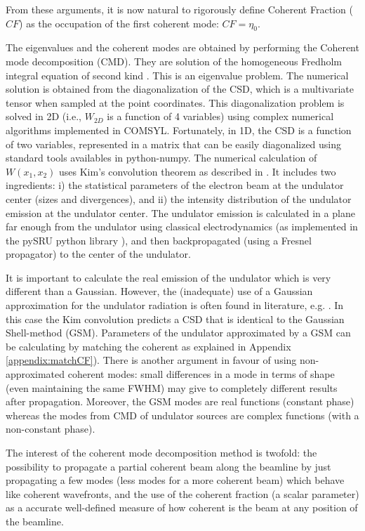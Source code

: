 \documentclass{iucr}              %
\begin{document}
From these arguments, it is now natural to rigorously define Coherent Fraction ($CF$) as the occupation of the first coherent mode: $CF=\eta_0$.

The eigenvalues and the coherent modes are obtained by performing the Coherent mode decomposition (CMD). They are solution of the homogeneous Fredholm integral equation of second kind \cite{glass2017}. This is an eigenvalue problem. The numerical solution is obtained from the diagonalization of the CSD, which is a multivariate tensor when sampled at the point coordinates. This diagonalization problem is solved in 2D (i.e., $W_{2D}$ is a function of 4 variables) using complex numerical algorithms implemented in COMSYL. Fortunately, in 1D, the CSD is a function of two variables, represented in a matrix that can be easily diagonalized using standard tools availables in python-numpy. The numerical calculation of $W(x_1,x_2)$ uses Kim's convolution theorem \cite{kim1986b} as described in \cite{glass2017}. It includes two ingredients: i) the statistical parameters of the electron beam at the undulator center (sizes and divergences), and ii) the intensity distribution of the undulator emission at the undulator center. The undulator emission is calculated in a plane far enough from the undulator using classical electrodynamics \cite{jackson} (as implemented in the pySRU python library \cite{pySRU}), and then backpropagated (using a Fresnel propagator) to the center of the undulator. 

It is important to calculate the real emission of the undulator which is very different than a Gaussian. However, the (inadequate) use of a Gaussian approximation for the undulator radiation is often found in literature, e.g.  \cite{coisson1997}. In this case the Kim convolution predicts a CSD that is identical to the Gaussian Shell-method (GSM). Parameters of the undulator approximated by a GSM can be calculating by matching the coherent as explained in Appendix \ref{appendix:matchCF}). There is another argument in favour of using non-approximated coherent modes: small differences in a mode in terms of shape (even maintaining the same FWHM) may give to completely different results after propagation. Moreover, the GSM modes are real functions (constant phase) whereas the modes from CMD of undulator sources are complex functions (with a non-constant phase).

The interest of the coherent mode decomposition method is twofold: the possibility to propagate a partial coherent beam along the beamline by just propagating a few modes (less modes for a more coherent beam) which behave like coherent wavefronts, and the use of the coherent fraction (a scalar parameter) as a accurate well-defined measure of how coherent is the beam at any position of the beamline.
\end{document}
